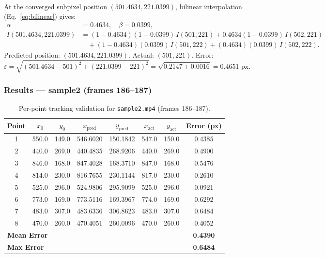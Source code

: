 \documentclass[12pt, a4paper]{article}
\begin{document}
At the converged subpixel position $(501.4634, 221.0399)$, bilinear interpolation (Eq.~\eqref{eq:bilinear}) gives:
\begin{align*}
\alpha &= 0.4634,\quad \beta = 0.0399, \\
I(501.4634, 221.0399) &= (1\!-\!0.4634)(1\!-\!0.0399)\,I(501,221) + 0.4634(1\!-\!0.0399)\,I(502,221)\\
&\quad + (1\!-\!0.4634)(0.0399)\,I(501,222) + (0.4634)(0.0399)\,I(502,222).
\end{align*}
Predicted position: $(501.4634, 221.0399)$. Actual: $(501, 221)$. Error:
\[
\varepsilon = \sqrt{(501.4634 - 501)^2 + (221.0399 - 221)^2} = \sqrt{0.2147 + 0.0016} = 0.4651\text{ px.}
\]

\subsubsection{Results --- sample2 (frames 186--187)}

\begin{table}[H]
\centering
\begin{tabular}{cccccccc}
\toprule
\textbf{Point} & $x_0$ & $y_0$ & $x_{\text{pred}}$ & $y_{\text{pred}}$ & $x_{\text{act}}$ & $y_{\text{act}}$ & \textbf{Error (px)} \\
\midrule
1 & 550.0 & 149.0 & 546.6020 & 150.1842 & 547.0 & 150.0 & 0.4385 \\
2 & 440.0 & 269.0 & 440.4835 & 268.9206 & 440.0 & 269.0 & 0.4900 \\
3 & 846.0 & 168.0 & 847.4028 & 168.3710 & 847.0 & 168.0 & 0.5476 \\
4 & 814.0 & 230.0 & 816.7655 & 230.1144 & 817.0 & 230.0 & 0.2610 \\
5 & 525.0 & 296.0 & 524.9806 & 295.9099 & 525.0 & 296.0 & 0.0921 \\
6 & 773.0 & 169.0 & 773.5116 & 169.3967 & 774.0 & 169.0 & 0.6292 \\
7 & 483.0 & 307.0 & 483.6336 & 306.8623 & 483.0 & 307.0 & 0.6484 \\
8 & 470.0 & 260.0 & 470.4051 & 260.0096 & 470.0 & 260.0 & 0.4052 \\
\midrule
\multicolumn{7}{l}{\textbf{Mean Error}} & \textbf{0.4390} \\
\multicolumn{7}{l}{\textbf{Max Error}} & \textbf{0.6484} \\
\bottomrule
\end{tabular}
\caption{Per-point tracking validation for \texttt{sample2.mp4} (frames 186--187).}
\label{tab:tracking2}
\end{table}
\end{document}
